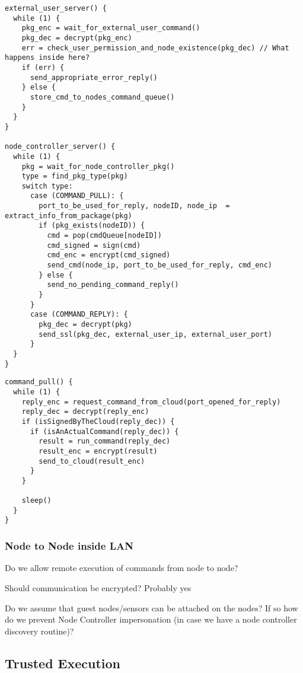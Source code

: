 \begin{lstlisting}[frame=single,caption=Cloud]
external_user_server() {
  while (1) {
    pkg_enc = wait_for_external_user_command()
    pkg_dec = decrypt(pkg_enc)
    err = check_user_permission_and_node_existence(pkg_dec) // What happens inside here?
    if (err) {
      send_appropriate_error_reply()
    } else {
      store_cmd_to_nodes_command_queue()
    }
  }
}

node_controller_server() {
  while (1) {
    pkg = wait_for_node_controller_pkg()
    type = find_pkg_type(pkg)
    switch type:
      case (COMMAND_PULL): {
        port_to_be_used_for_reply, nodeID, node_ip  = extract_info_from_package(pkg)
        if (pkg_exists(nodeID)) {
          cmd = pop(cmdQueue[nodeID])
          cmd_signed = sign(cmd)
          cmd_enc = encrypt(cmd_signed)
          send_cmd(node_ip, port_to_be_used_for_reply, cmd_enc)
        } else {
          send_no_pending_command_reply()
        }
      }
      case (COMMAND_REPLY): {
        pkg_dec = decrypt(pkg)
        send_ssl(pkg_dec, external_user_ip, external_user_port)
      }
  }
}
\end{lstlisting}

\begin{lstlisting}[frame=single,caption=Node Controller]
command_pull() {
  while (1) {
    reply_enc = request_command_from_cloud(port_opened_for_reply)
    reply_dec = decrypt(reply_enc)
    if (isSignedByTheCloud(reply_dec)) {
      if (isAnActualCommand(reply_dec)) {
        result = run_command(reply_dec)
        result_enc = encrypt(result)
        send_to_cloud(result_enc)
      }
    }

    sleep()
  }
}
\end{lstlisting}

\subsubsection{Node to Node inside LAN}
Do we allow remote execution of commands from node to node?

Should communication be encrypted? Probably yes

Do we assume that guest nodes/sensors can be attached on the nodes? If so how do we prevent Node Controller impersonation (in case we have a node controller discovery routine)?


\subsection{Trusted Execution}

